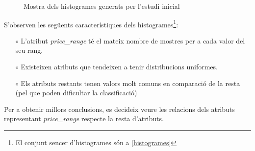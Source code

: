 \documentclass[a4paper, 11pt]{article}
\begin{document}
\begin{figure}[h]
    \centering
    \caption{Mostra dels histogrames generats per l'estudi inicial}
\end{figure}
\hspace{-1.4 em}S'observen les següents característiques dels histogrames\footnote{El conjunt sencer d'histogrames són a \textcolor{blue}{\ref{histogrames}}}:
\begin{itemize}
    \item [$\circ$] L'atribut \textit{price\_range} té el mateix nombre de mostres per a cada valor del seu rang.
    \item [$\circ$] Existeixen atributs que tendeixen a tenir distribucions uniformes.
    \item [$\circ$] Els atributs restants tenen valors molt comuns en comparació de la resta (pel que poden dificultar la classificació)
\end{itemize}
Per a obtenir millors conclusions, es decideix veure les relacions dels atributs representant \textit{price\_range} respecte la resta d'atributs.
\end{document}
